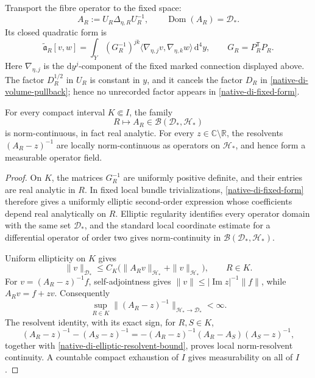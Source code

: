 Transport the fibre operator to the fixed space:
\begin{equation}
 A_R:=U_R\Delta_{\eta,R}U_R^{-1},
 \qquad
 \operatorname{Dom}(A_R)=\mathscr D_*.
\label{native-di-fixed-fibre}
\end{equation}
Its closed quadratic form is
\begin{equation}
 \widetilde{\mathfrak a}_R[v,w]
 =\int_Y(G_R^{-1})^{jk}
  \langle\nabla_{\eta,j}v,\nabla_{\eta,k}w\rangle\,\mathrm d^4y,
 \qquad G_R=P_R^{\mathsf T}P_R.
\label{native-di-fixed-form}
\end{equation}
Here \(\nabla_{\eta,j}\) is the \(\mathrm dy^j\)-component of the fixed
marked connection displayed above.  The factor \(D_R^{1/2}\) in \(U_R\) is
constant in \(y\), and it cancels
the factor \(D_R\) in \eqref{native-di-volume-pullback}; hence no unrecorded
factor appears in \eqref{native-di-fixed-form}.

\begin{lemma}
\label{native-di-common-domain-lemma}
For every compact interval \(K\Subset I\), the family
\[
 R\longmapsto A_R\in\mathcal B(\mathscr D_*,\mathscr H_*)
\]
is norm-continuous, in fact real analytic.  For every
\(z\in\mathbb C\setminus\mathbb R\), the resolvents
\((A_R-z)^{-1}\) are locally norm-continuous as operators on
\(\mathscr H_*\), and hence form a measurable operator field.
\end{lemma}

\begin{proof}
On \(K\), the matrices \(G_R^{-1}\) are uniformly positive definite, and
their entries are real analytic in \(R\).  In fixed local bundle
trivializations, \eqref{native-di-fixed-form} therefore gives a uniformly
elliptic second-order expression whose coefficients depend real
analytically on \(R\).  Elliptic regularity identifies every operator
domain with the same set \(\mathscr D_*\), and the standard local
coordinate estimate for a differential operator of order two gives
norm-continuity in
\(\mathcal B(\mathscr D_*,\mathscr H_*)\).

Uniform ellipticity on \(K\) gives
\[
 \|v\|_{\mathscr D_*}
 \le C_K\bigl(\|A_Rv\|_{\mathscr H_*}
                  +\|v\|_{\mathscr H_*}\bigr),
 \qquad R\in K.
\]
For \(v=(A_R-z)^{-1}f\), self-adjointness gives
\(\|v\|\le|\operatorname{Im}z|^{-1}\|f\|\), while
\(A_Rv=f+zv\).  Consequently
\begin{equation}
 \sup_{R\in K}
 \|(A_R-z)^{-1}\|_{\mathscr H_*\to\mathscr D_*}<\infty.
\label{native-di-elliptic-resolvent-bound}
\end{equation}
The resolvent identity, with its exact sign, for \(R,S\in K\),
\[
 (A_R-z)^{-1}-(A_S-z)^{-1}
 =-(A_R-z)^{-1}(A_R-A_S)(A_S-z)^{-1},
\]
together with \eqref{native-di-elliptic-resolvent-bound}, proves local
norm-resolvent continuity.  A countable compact exhaustion of \(I\) gives
measurability on all of \(I\).
\end{proof}

